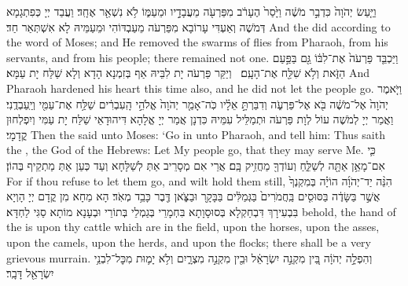 {וַיַּ֤עַשׂ יְהֹוָה֙ כִּדְבַ֣ר מֹשֶׁ֔ה וַיָּ֙סַר֙ הֶעָרֹ֔ב מִפַּרְעֹ֖ה מֵעֲבָדָ֣יו וּמֵעַמּ֑וֹ לֹ֥א נִשְׁאַ֖ר אֶחָֽד׃
}
{וַעֲבַד יְיָ כְּפִתְגָמָא דְּמֹשֶׁה וְאַעְדִּי עָרוֹבָא מִפַּרְעֹה מֵעַבְדּוֹהִי וּמֵעַמֵּיהּ לָא אִשְׁתְּאַר חַד׃}
{And the \lord\space did according to the word of Moses; and He removed the swarms of flies from Pharaoh, from his servants, and from his people; there remained not one.}{}
{וַיַּכְבֵּ֤ד פַּרְעֹה֙ אֶת־לִבּ֔וֹ גַּ֖ם בַּפַּ֣עַם הַזֹּ֑את וְלֹ֥א שִׁלַּ֖ח אֶת־הָעָֽם׃ \petucha 
{}}
{וְיַקַּר פַּרְעֹה יָת לִבֵּיהּ אַף בְּזִמְנָא הָדָא וְלָא שַׁלַּח יָת עַמָּא׃}
{And Pharaoh hardened his heart this time also, and he did not let the people go.}{}
\newperek
{}%
{וַיֹּ֤אמֶר יְהֹוָה֙ אֶל־מֹשֶׁ֔ה בֹּ֖א אֶל־פַּרְעֹ֑ה וְדִבַּרְתָּ֣ אֵלָ֗יו כֹּֽה־אָמַ֤ר יְהֹוָה֙ אֱלֹהֵ֣י הָֽעִבְרִ֔ים שַׁלַּ֥ח אֶת־עַמִּ֖י וְיַֽעַבְדֻֽנִי׃}
{וַאֲמַר יְיָ לְמֹשֶׁה עוֹל לְוָת פַּרְעֹה וּתְמַלֵּיל עִמֵּיהּ כִּדְנָן אֲמַר יְיָ אֱלָהָא דִּיהוּדָאֵי שַׁלַּח יָת עַמִּי וְיִפְלְחוּן קֳדָמָי׃}
{Then the \lord\space said unto Moses: ‘Go in unto Pharaoh, and tell him: Thus saith the \lord, the God of the Hebrews: Let My people go, that they may serve Me.}{}
{כִּ֛י אִם־מָאֵ֥ן אַתָּ֖ה לְשַׁלֵּ֑חַ וְעוֹדְךָ֖ מַחֲזִ֥יק בָּֽם׃
}
{אֲרֵי אִם מְסָרֵיב אַתְּ לְשַׁלָּחָא וְעַד כְּעַן אַתְּ מַתְקֵיף בְּהוֹן׃}
{For if thou refuse to let them go, and wilt hold them still,}{}
{הִנֵּ֨ה יַד־יְהֹוָ֜ה הוֹיָ֗ה בְּמִקְנְךָ֙ אֲשֶׁ֣ר בַּשָּׂדֶ֔ה בַּסּוּסִ֤ים בַּֽחֲמֹרִים֙ בַּגְּמַלִּ֔ים בַּבָּקָ֖ר וּבַצֹּ֑אן דֶּ֖בֶר כָּבֵ֥ד מְאֹֽד׃
}
{הָא מַחָא מִן קֳדָם יְיָ הָוְיָא בִּבְעִירָךְ דִּבְחַקְלָא בְּסוּסָוָתָא בִּחְמָרֵי בְּגַמְלֵי בְּתוֹרֵי וּבְעָנָא מוֹתָא סַגִּי לַחְדָּא׃}
{behold, the hand of the \lord\space is upon thy cattle which are in the field, upon the horses, upon the asses, upon the camels, upon the herds, and upon the flocks; there shall be a very grievous murrain.}{}
{וְהִפְלָ֣ה יְהֹוָ֔ה בֵּ֚ין מִקְנֵ֣ה יִשְׂרָאֵ֔ל וּבֵ֖ין מִקְנֵ֣ה מִצְרָ֑יִם וְלֹ֥א יָמ֛וּת מִכׇּל־לִבְנֵ֥י יִשְׂרָאֵ֖ל דָּבָֽר׃
}

